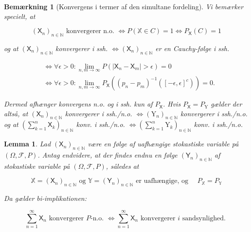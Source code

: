 \documentclass{article}
\newcommand{\1}{\mathbbm{1}}
\newcommand{\X}{\mathsf{X}}
\theoremstyle{boxed}
\newtheorem{lemma}[theorem]{Lemma}
\newtheorem{remark}[theorem]{Bemærkning}
\begin{document}
\begin{remark}[Konvergens i termer af den simultane fordeling] 
    Vi bemærker specielt, at

$$
\left(\X_n\right)_{n \in \mathbb{N}} \text { konvergerer n.o. } \Longleftrightarrow P(\mathbb{X} \in C)=1 \Longleftrightarrow P_{\X}(C)=1
$$

og at
$\left(\X_n\right)_{n \in \mathbb{N}}$ konvergerer i ssh. $\Longleftrightarrow\left(\X_n\right)_{n \in \mathbb{N}}$ er en Cauchy-følge i ssh.

$$
\begin{aligned}
& \Longleftrightarrow \forall \epsilon>0: \lim _{n, m \rightarrow \infty} P\left(\left|\X_n-\X_m\right|>\epsilon\right)=0 \\
& \Longleftrightarrow \forall \epsilon>0: \lim _{n, m \rightarrow \infty} P_{\X}\left(\left(p_n-p_m\right)^{-1}\left([-\epsilon, \epsilon]^c\right)\right)=0 .
\end{aligned}
$$


Dermed afhænger konvergens n.o. og i ssh. kun af $P_{\X}$.
Hvis $P_{\X}=P_{\mathrm{Y}}$ gælder der altså, at
$\left(\X_n\right)_{n \in \mathbb{N}}$ konvergerer i ssh./n.o. $\Longleftrightarrow\left(\mathrm{Y}_n\right)_{n \in \mathbb{N}}$ konvergerer i ssh./n.o.
og at
$\left(\sum_{k=1}^n \X_k\right)_{n \in \mathbb{N}}$ konv. i ssh./n.o. $\Longleftrightarrow\left(\sum_{k=1}^n \mathrm{Y}_k\right)_{n \in \mathbb{N}}$ konv. i ssh./n.o.
\end{remark}
\begin{theorem-box}
    \begin{lemma}
        Lad $\left(\mathsf{X}_n\right)_{n \in \mathbb{N}}$ være en følge af uafhængige stokastiske variable på $(\Omega, \mathcal{F}, P)$.
Antag endvidere, at der findes endnu en følge $\left(\mathsf{Y}_n\right)_{n \in \mathbb{N}}$ af stokastiske variable på $(\Omega, \mathcal{F}, P)$, således at

$$
\mathbb{X}=\left(\mathsf{X}_n\right)_{n \in \mathbb{N}} \text { og } \mathbb{Y}=\left(\mathsf{Y}_n\right)_{n \in \mathbb{N}} \text { er uafhængige, og } \quad P_{\mathbb{X}}=P_{\mathbb{Y}}
$$


Da gælder bi-implikationen:

$$
\sum_{n=1}^{\infty} \mathsf{X}_n \text { konvergerer } P \text {-n.o. } \Longleftrightarrow \sum_{n=1}^{\infty} \mathsf{X}_n \text { konvergerer } i \text { sandsynlighed. }
$$

    \end{lemma}
\end{theorem-box}
\end{document}

